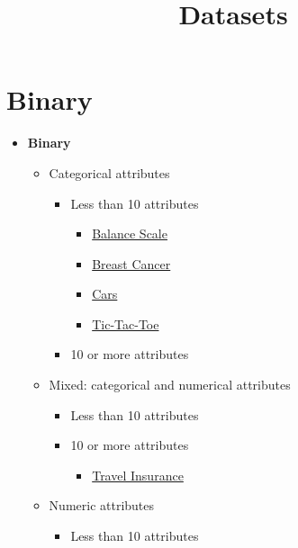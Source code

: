 \documentclass[]{article}
\title{Datasets}
\author{}
\date{}
\providecommand{\tightlist}{%
  \setlength{\itemsep}{0pt}\setlength{\parskip}{0pt}}
\begin{document}
\maketitle

\hypertarget{binary}{%
\section{Binary}\label{binary}}

\begin{itemize}
\tightlist
\item
  \textbf{Binary}

  \begin{itemize}
  \tightlist
  \item
    Categorical attributes

    \begin{itemize}
    \tightlist
    \item
      Less than 10 attributes

      \begin{itemize}
      \tightlist
      \item
        \protect\hyperlink{Balance-Scale}{Balance Scale}
      \item
        \protect\hyperlink{Breast-Cancer}{Breast Cancer}
      \item
        \protect\hyperlink{Cars}{Cars}
      \item
        \protect\hyperlink{Tic-Tac-Toe}{Tic-Tac-Toe}
      \end{itemize}
    \item
      10 or more attributes
    \end{itemize}
  \item
    Mixed: categorical and numerical attributes

    \begin{itemize}
    \tightlist
    \item
      Less than 10 attributes
    \item
      10 or more attributes

      \begin{itemize}
      \tightlist
      \item
        \protect\hyperlink{Travel-insurance}{Travel Insurance}
      \end{itemize}
    \end{itemize}
  \item
    Numeric attributes

    \begin{itemize}
    \tightlist
    \item
      Less than 10 attributes


\end{itemize}
\end{itemize}
\end{itemize}
\end{document}

